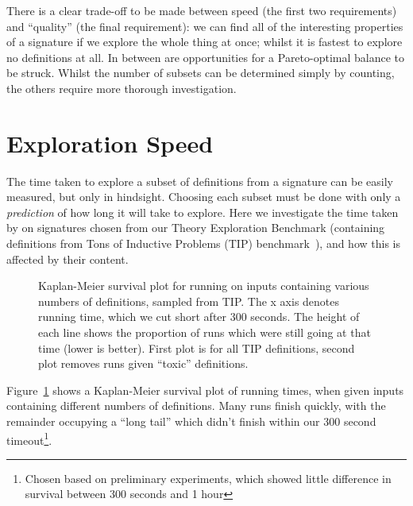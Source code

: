 There is a clear trade-off to be made between speed (the first two requirements)
and ``quality'' (the final requirement): we can find all of the interesting
properties of a signature if we explore the whole thing at once; whilst it
is fastest to explore no definitions at all. In between are opportunities for a
Pareto-optimal balance to be struck. Whilst the number of subsets can be
determined simply by counting, the others require more thorough investigation.

\section{Exploration Speed}

The time taken to explore a subset of definitions from a signature can be easily
measured, but only in hindsight. Choosing each subset must be done with only a
\emph{prediction} of how long it will take to explore. Here we investigate the
time taken by \quickspec{} on signatures chosen from our Theory Exploration
Benchmark (containing definitions from Tons of Inductive Problems (TIP)
benchmark~\cite{claessen2015tip}), and how this is affected by their content.

\begin{figure}
  \centering
  \scalebox{0.5}{}
  \scalebox{0.5}{}
  \scalebox{0.5}{}
  \scalebox{0.5}{}
  \caption{Kaplan-Meier survival plot for running \quickspec{} on inputs
    containing various numbers of definitions, sampled from TIP. The x axis
    denotes running time, which we cut short after 300 seconds. The height of
    each line shows the proportion of \quickspec{} runs which were still going
    at that time (lower is better). First plot is for all TIP definitions,
    second plot removes runs given ``toxic'' definitions.
    \iffalse
    TODO: Alison: The key needs further explanation (either here or in the caption)
    TODO: Alison: Label the y axis (on both)
    \fi}
  \label{fig:survival}
\end{figure}

Figure~\ref{fig:survival} shows a Kaplan-Meier survival plot of \quickspec{}
running times, when given inputs containing different numbers of definitions.
Many runs finish quickly, with the remainder occupying a ``long tail'' which
didn't finish within our 300 second timeout\footnote{Chosen based on preliminary
  experiments, which showed little difference in survival between 300 seconds
  and 1 hour}.

